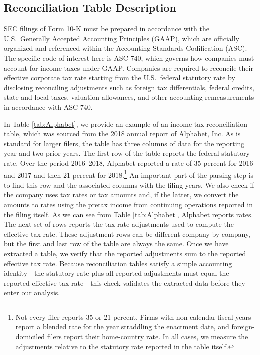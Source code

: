 \documentclass[11pt,letterpaper]{article}
\begin{document}
\subsection{Reconciliation Table Description}

SEC filings of Form 10-K must be prepared in accordance with the U.S.~Generally
Accepted Accounting Principles (GAAP), which are officially organized and 
referenced within the Accounting Standards Codification (ASC). The specific
code of interest here is ASC 740, which governs how companies must account
for income taxes under GAAP. 
Companies are required to reconcile their effective corporate tax rate 
starting from the U.S.~federal statutory rate 
by disclosing reconciling adjustments 
such as 
foreign tax differentials,
federal credits,
state and local taxes,
valuation allowances,
and other accounting remeasurements in accordance with ASC 740.

In Table \ref{tab:Alphabet}, we provide an example of an income tax reconciliation
table, which was sourced from the 2018 annual report of Alphabet, Inc.
As is standard for larger filers, the table has three columns of data for the
reporting year and two prior years.  The first row of the table reports the federal statutory rate.
Over the period 2016--2018, Alphabet reported a rate of 35 percent 
for 2016 and 2017 and then 21 percent for 2018.\footnote{%
Not every filer reports 35 or 21 percent. Firms with non-calendar fiscal years
report a blended rate for the year straddling the enactment date, and
foreign-domiciled filers report their home-country rate. In all cases, we
measure the adjustments relative to the statutory rate reported in the
table itself.}
An important part of the parsing step is to find this row and the associated
columns with the filing years.
We also check if the company uses tax rates or tax amounts and, if the
latter, we convert the amounts to rates using the pretax income from
continuing operations reported in the filing itself.
As we can see from Table \ref{tab:Alphabet}, Alphabet reports rates.
The next set of rows reports the tax rate adjustments used
to compute the effective tax rate.  
These adjustment rows can be different company by company, but the first and last 
row of the table are always the same. 
Once we have extracted a table, we verify that the reported adjustments 
sum to the reported effective tax rate. Because reconciliation 
tables satisfy a simple accounting identity---the statutory rate plus 
all reported adjustments must equal the reported effective 
tax rate---this check validates the extracted data before they enter our
analysis. 
\end{document}
